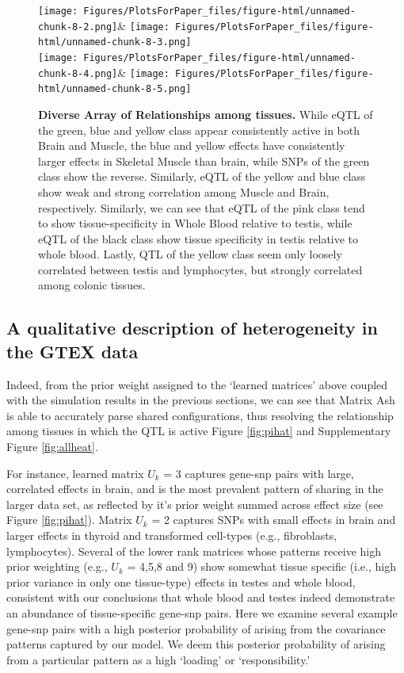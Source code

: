 \begin{figure}[htbp]
\texttt{[image: Figures/PlotsForPaper\_files/figure-html/unnamed-chunk-8-2.png]}&
\texttt{[image: Figures/PlotsForPaper\_files/figure-html/unnamed-chunk-8-3.png]}\\
\hfill
\texttt{[image: Figures/PlotsForPaper\_files/figure-html/unnamed-chunk-8-4.png]}&
\texttt{[image: Figures/PlotsForPaper\_files/figure-html/unnamed-chunk-8-5.png]}
\caption{\textbf {Diverse Array of Relationships among tissues.} While eQTL of the green, blue and yellow class appear consistently active in both Brain and Muscle, the blue and yellow effects have consistently larger effects in Skeletal Muscle than brain, while SNPs of the green class show the reverse. Similarly, eQTL of the yellow and blue class show weak and strong correlation among Muscle and Brain, respectively. Similarly, we can see that eQTL of the pink class tend to show tissue-specificity in Whole Blood relative to testis, while eQTL of the black class show tissue specificity in testis relative to whole blood. Lastly, QTL of the yellow class seem only loosely correlated between testis and lymphocytes, but strongly correlated among colonic tissues.}
\label{fig:twoplot}
\end{figure}


\subsection{A qualitative description of heterogeneity in the GTEX data}

Indeed, from the prior weight assigned to the `learned matrices' above coupled with the simulation results in the previous sections, we can see that Matrix Ash is able to accurately parse shared configurations, thus resolving the relationship among tissues in which the QTL is active Figure \ref{fig:pihat} and Supplementary Figure \ref{fig:allheat}. 

For instance, learned matrix $U_{k}$ = 3 captures gene-snp pairs with large, correlated effects in brain, and is the most prevalent pattern of sharing in the larger data set, as reflected by it's prior weight summed across effect size (see Figure \ref{fig:pihat}). Matrix $U_{k}$ = 2 captures SNPs with small effects in brain and larger effects in thyroid and transformed cell-types (e.g., fibroblasts, lymphocytes). Several of the lower rank matrices whose patterns receive high prior weighting (e.g., $U_{k}$ = 4,5,8 and 9) show somewhat tissue specific (i.e., high prior variance in only one tissue-type) effects in testes and whole blood, consistent with our conclusions that whole blood and testes indeed demonstrate an abundance of tissue-specific gene-snp pairs. Here we examine several example gene-snp pairs with a high posterior probability of arising from the covariance patterns captured by our model. We deem this posterior probability of arising from a particular pattern as a high `loading' or `responsibility.' 


